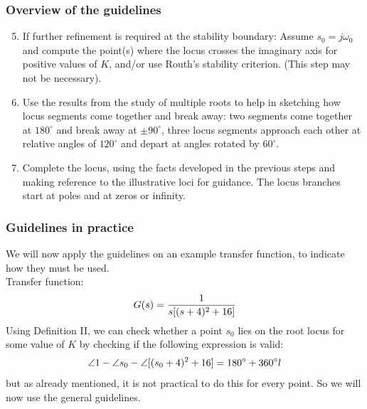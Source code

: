\begin{frame}
\frametitle{Overview of the guidelines}
	\begin{block}{}
	\begin{enumerate}
	\setcounter{enumi}{4}
	\item If further refinement is required at the stability boundary: Assume $s_0 = j\omega_0$ and compute the point(s) where the locus crosses the imaginary axis for positive values of $K$, and/or use Routh's stability criterion. (This step may not be necessary).
	\item Use the results from the study of multiple roots to help in sketching how locus segments come together and break away: two segments come together at $180^{\circ}$ and break away at $\pm 90^{\circ}$, three locus segments approach each other at relative angles of $120^{\circ}$ and depart at angles rotated by $60^{\circ}$.
	\item Complete the locus, using the facts developed in the previous steps and making reference to the illustrative loci for guidance. The locus branches start at poles and at zeros or infinity.
	\end{enumerate}
	\end{block}
\end{frame}

\begin{frame}
\frametitle{Guidelines in practice}
	We will now apply the guidelines on an example transfer function, to indicate how they must be used.\\
	\vspace{0.5em}
	Transfer function:
	\vspace{-0.5em}
	\begin{equation}
	G(s) = \frac{1}{s[(s+4)^{2} + 16]}
	\vspace{-0.5em}
	\end{equation}
	Using Definition II, we can check whether a point $s_0$ lies on the root locus for some value of $K$ by checking if the following expression is valid: 
	\vspace{-0.5em}
	\begin{equation}
	\angle 1 - \angle s_0 -\angle [(s_0 + 4)^2 + 16] = 180^{\circ} + 360^{\circ}l
	\vspace{-0.5em}
	\end{equation}
	but as already mentioned, it is not practical to do this for every point. So we will now use the general guidelines. 
\end{frame}	

